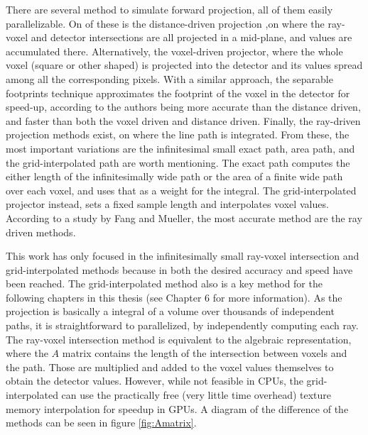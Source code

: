 There are several method to simulate forward projection, all of them easily parallelizable. On of these is the distance-driven projection \cite{BrunoDeMan}\cite{schlifske2016fast},on where the ray-voxel and detector intersections are all projected in a mid-plane, and values are accumulated there. Alternatively, the voxel-driven projector\cite{Du2017}, where the whole voxel (square or other shaped\cite{lewitt1992alternatives}) is projected into the detector and its values spread among all the corresponding pixels. With a similar approach, the separable footprints technique\cite{long20103d}\cite{wu2011gpu} approximates the footprint of the voxel in the detector for speed-up, according to the authors being more accurate than the distance driven, and faster than both the voxel driven and distance driven. Finally, the ray-driven projection\cite{siddon1985fast}\cite{xu2010fast}\cite{chou2011fast} methods exist, on where the line path is integrated. From these, the most important variations are the infinitesimal small exact path, area path, and the grid-interpolated path are worth mentioning. The exact path computes the either length of the infinitesimally wide path or the area of a finite wide path over each voxel, and uses that as a weight for the integral. The grid-interpolated projector instead, sets a fixed sample length and interpolates voxel values. According to a study by Fang and Mueller\cite{1625152}, the most accurate method are the ray driven methods.

This work has only focused in the infinitesimally small ray-voxel intersection and grid-interpolated methods because in both the desired accuracy and speed have been reached. The grid-interpolated method also is a key method for the following chapters in this thesis (see Chapter 6 for more information). As the projection is basically a integral of a volume over thousands of independent paths, it is straightforward to parallelized, by independently computing each ray. The ray-voxel intersection method is equivalent to the algebraic representation, where the $A$ matrix contains the length of the intersection between voxels and the path. Those are multiplied and added to the voxel values themselves to obtain the detector values. However, while not feasible in CPUs, the grid-interpolated can use the practically free (very little time overhead) texture memory interpolation for speedup in GPUs. A diagram of the difference of the methods can be seen in figure \ref{fig:Amatrix}. 

